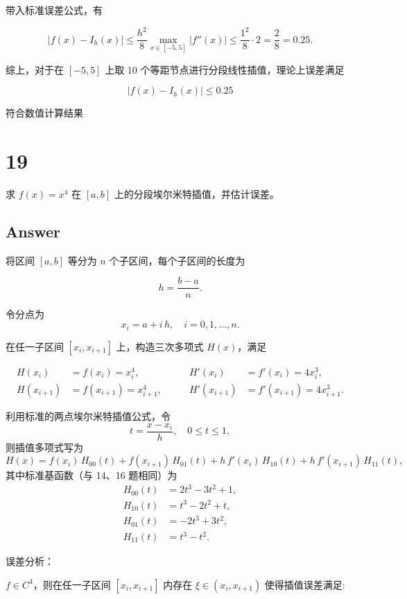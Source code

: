 \documentclass[11pt]{article}
\begin{document}
带入标准误差公式，有

\[
|f(x)-I_h(x)|\le \frac{h^2}{8}\max_{x\in[-5,5]}|f''(x)| \le \frac{1^2}{8}\cdot 2 = \frac{2}{8}=0.25.
\]

综上，对于在 \([-5,5]\) 上取 10
个等距节点进行分段线性插值，理论上误差满足

\[
\boxed{
|f(x)-I_h(x)|\le 0.25}
\]

符合数值计算结果

    \section{19}\label{section}

求 \(f(x) = x^4\) 在 \([a, b]\) 上的分段埃尔米特插值，并估计误差。

\subsection{Answer}\label{answer}

将区间 \([a,b]\) 等分为 \(n\) 个子区间，每个子区间的长度为

\[
h = \frac{b-a}{n}.
\]

令分点为 \[
x_i = a + i\, h,\quad i = 0,1,\dots,n.
\]

在任一子区间 \([x_i, x_{i+1}]\) 上，构造三次多项式 \(H(x)\)，满足

\[
\begin{aligned}
H(x_i) &= f(x_i)= x_i^4,\qquad &H'(x_i) &= f'(x_i)= 4x_i^3,\\[1mm]
H(x_{i+1}) &= f(x_{i+1}) = x_{i+1}^4,\qquad &H'(x_{i+1}) &= f'(x_{i+1})= 4 x_{i+1}^3.
\end{aligned}
\]

利用标准的两点埃尔米特插值公式，令 \[
t = \frac{x - x_i}{h},\quad 0\le t\le 1,
\] 则插值多项式写为 \[
H(x)= f(x_i)\, H_{00}(t) + f(x_{i+1})\, H_{01}(t) + h\, f'(x_i)\, H_{10}(t) + h\, f'(x_{i+1})\, H_{11}(t),
\] 其中标准基函数（与 14、16 题相同）为 \[
\begin{aligned}
H_{00}(t) &= 2t^3 - 3t^2 + 1,\\[1mm]
H_{10}(t) &= t^3 - 2t^2 + t,\\[1mm]
H_{01}(t) &= -2t^3 + 3t^2,\\[1mm]
H_{11}(t) &= t^3 - t^2.
\end{aligned}
\]

误差分析：

\(f \in C^4\)，则在任一子区间 \([x_i, x_{i+1}]\) 内存在
\(\xi\in(x_i,x_{i+1})\) 使得插值误差满足:
\end{document}
